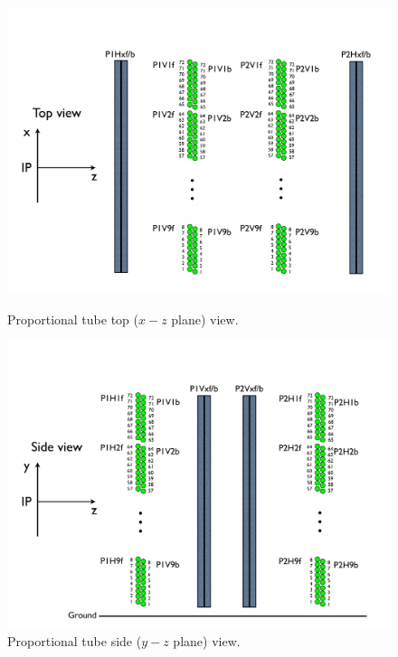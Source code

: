 \begin{figure}
	\centering
	\begin{minipage}[t]{0.49\linewidth}
		\includegraphics[width=\linewidth]{figures/proptubeview_xz.pdf}
		\caption{Proportional tube top ($x-z$ plane) view.}
		\label{fig:proptube:xzview}
	\end{minipage}
	\begin{minipage}[t]{0.49\linewidth}
		\includegraphics[width=1.03\linewidth]{figures/proptubeview_yz.pdf}
		\caption{Proportional tube side ($y-z$ plane) view.}
		\label{fig:proptube:yzview}
	\end{minipage}
\end{figure}

